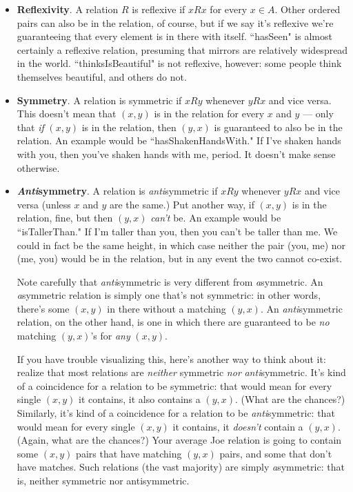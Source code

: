 \begin{itemize}

\item \textbf{Reflexivity}. A relation $R$ is reflexive if $x R x$ for
every $x \in A$. Other ordered pairs can also be in the relation, of
course, but if we say it's reflexive we're guaranteeing that every element
is in there with itself. ``hasSeen" is almost certainly a reflexive
relation, presuming that mirrors are relatively widespread in the world.
``thinksIsBeautiful" is not reflexive, however: some people think
themselves beautiful, and others do not.

\item \textbf{Symmetry}. A relation is symmetric if $x R y$ whenever $y R
x$ and vice versa. This doesn't mean that $(x,y)$ is in the relation for
every $x$ and $y$ --- only that \textit{if} $(x,y)$ is in the relation,
then $(y,x)$ is guaranteed to also be in the relation. An example would be
``hasShakenHandsWith." If I've shaken hands with you, then you've shaken
hands with me, period. It doesn't make sense otherwise.

\item \textbf{\textit{Anti}symmetry}. A relation is \textit{anti}symmetric
if $x$\sout{$R$}$y$ whenever $y R x$ and vice versa (unless $x$ and $y$ are
the same.) Put another way, if $(x,y)$ is in the relation, fine, but then
$(y,x)$ \textit{can't} be. An example would be ``isTallerThan." If I'm
taller than you, then you can't be taller than me. We could in fact be the
same height, in which case neither the pair (you, me) nor (me, you) would
be in the relation, but in any event the two cannot co-exist.

Note carefully that \textit{anti}symmetric is very different from
\textit{a}symmetric. An \textit{a}symmetric relation is simply one that's
not symmetric: in other words, there's some $(x,y)$ in there without a
matching $(y,x)$. An \textit{anti}symmetric relation, on the other hand, is
one in which there are guaranteed to be \textit{no} matching $(y,x)$'s for
\textit{any} $(x,y)$.

If you have trouble visualizing this, here's another way to think about it:
realize that most relations are \textit{neither} symmetric \textit{nor}
\textit{anti}symmetric. It's kind of a coincidence for a relation to be
symmetric: that would mean for every single $(x,y)$ it contains, it also
contains a $(y,x)$. (What are the chances?) Similarly, it's kind of a
coincidence for a relation to be \textit{anti}symmetric: that would mean
for every single $(x,y)$ it contains, it \textit{doesn't} contain a
$(y,x)$. (Again, what are the chances?) Your average Joe relation is going
to contain some $(x,y)$ pairs that have matching $(y,x)$ pairs, and some
that don't have matches. Such relations (the vast majority) are simply
\textit{a}symmetric: that is, neither symmetric nor antisymmetric.


\end{itemize}

